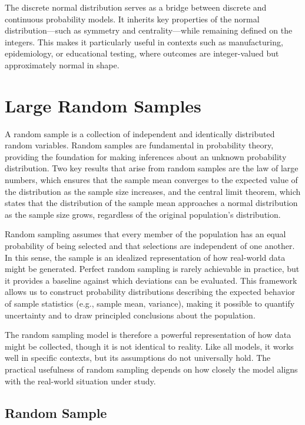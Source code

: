 The discrete normal distribution serves as a bridge between discrete and continuous probability models. It inherits key properties of the normal distribution—such as symmetry and centrality—while remaining defined on the integers. This makes it particularly useful in contexts such as manufacturing, epidemiology, or educational testing, where outcomes are integer-valued but approximately normal in shape.

%
%

\section{Large Random Samples}
\label{sec:probability_random_samples}

A random sample is a collection of independent and identically distributed random variables. Random samples are fundamental in probability theory, providing the foundation for making inferences about an unknown probability distribution. Two key results that arise from random samples are the law of large numbers, which ensures that the sample mean converges to the expected value of the distribution as the sample size increases, and the central limit theorem, which states that the distribution of the sample mean approaches a normal distribution as the sample size grows, regardless of the original population's distribution.

Random sampling assumes that every member of the population has an equal probability of being selected and that selections are independent of one another. In this sense, the sample is an idealized representation of how real-world data might be generated. Perfect random sampling is rarely achievable in practice, but it provides a baseline against which deviations can be evaluated. This framework allows us to construct probability distributions describing the expected behavior of sample statistics (e.g., sample mean, variance), making it possible to quantify uncertainty and to draw principled conclusions about the population.

The random sampling model is therefore a powerful representation of how data might be collected, though it is not identical to reality. Like all models, it works well in specific contexts, but its assumptions do not universally hold. The practical usefulness of random sampling depends on how closely the model aligns with the real-world situation under study.


\subsection{Random Sample}

